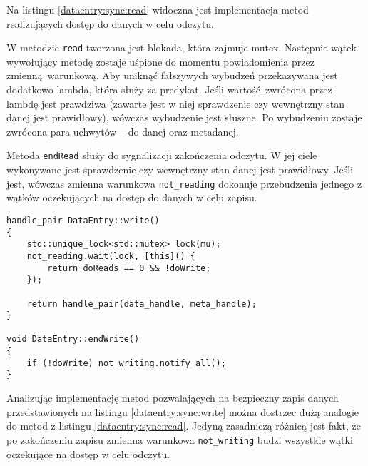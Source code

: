 Na listingu \ref{dataentry:sync:read} widoczna jest implementacja metod realizujących dostęp do danych w celu odczytu. 

W metodzie \lstinline$read$ tworzona jest blokada, która zajmuje mutex. Następnie wątek wywołujący metodę zostaje uśpione do momentu powiadomienia przez zmienną warunkową. Aby uniknąć fałszywych wybudzeń przekazywana jest dodatkowo lambda, która służy za predykat. Jeśli wartość zwrócona przez lambdę jest prawdziwa (zawarte jest w niej sprawdzenie czy wewnętrzny stan danej jest prawidłowy), wówczas wybudzenie jest słuszne. Po wybudzeniu zostaje zwrócona para uchwytów -- do danej oraz metadanej.

Metoda \lstinline$endRead$ służy do sygnalizacji zakończenia odczytu. W jej ciele wykonywane jest sprawdzenie czy wewnętrzny stan danej jest prawidłowy. Jeśli jest, wówczas zmienna warunkowa \lstinline$not_reading$ dokonuje przebudzenia jednego z wątków oczekujących na dostęp do danych w celu zapisu.

\begin{minipage}{\textwidth}
	\begin{lstlisting}[label=dataentry:sync:write, caption={Metody klasy \lstinline$DataEntry$ zapewniające bezpieczny zapis danych współdzielonych w środowisku wielowątkowym},alsoletter={()[].=}]
handle_pair DataEntry::write()
{
	std::unique_lock<std::mutex> lock(mu);
	not_reading.wait(lock, [this]() {
		return doReads == 0 && !doWrite;
	});

	return handle_pair(data_handle, meta_handle);
}

void DataEntry::endWrite()
{
	if (!doWrite) not_writing.notify_all();
}
	\end{lstlisting}
\end{minipage}

Analizując implementację metod pozwalających na bezpieczny zapis danych przedstawionych na listingu \ref{dataentry:sync:write} można dostrzec dużą analogie do metod z listingu \ref{dataentry:sync:read}. Jedyną zasadniczą różnicą jest fakt, że po zakończeniu zapisu zmienna warunkowa \lstinline$not_writing$ budzi wszystkie wątki oczekujące na dostęp w celu odczytu.
